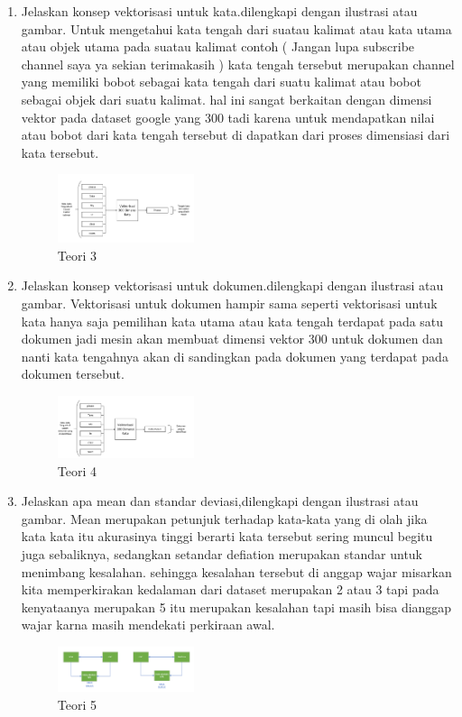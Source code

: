 \begin{enumerate}
	\item Jelaskan konsep vektorisasi untuk kata.dilengkapi dengan ilustrasi atau gambar.
	\hfill\break
	Untuk mengetahui kata tengah dari suatau kalimat atau kata utama atau objek utama pada suatau kalimat contoh ( Jangan lupa subscribe channel saya ya sekian terimakasih ) kata tengah tersebut merupakan channel yang memiliki bobot sebagai kata tengah dari suatu kalimat atau bobot sebagai objek dari suatu kalimat. hal ini sangat berkaitan dengan dimensi vektor pada dataset google yang 300 tadi karena untuk mendapatkan nilai atau bobot dari kata tengah tersebut di dapatkan dari proses dimensiasi dari kata tersebut. 
	\hfill\break
	\begin{figure}[H]
		\includegraphics[width=4cm]{figures/1174086/5/3.PNG}
		\centering
		\caption{Teori 3}
	\end{figure}

	\item Jelaskan konsep vektorisasi untuk dokumen.dilengkapi dengan ilustrasi atau gambar.
	\hfill\break
	Vektorisasi untuk dokumen hampir sama seperti vektorisasi untuk kata hanya saja pemilihan kata utama atau kata tengah terdapat pada satu dokumen jadi mesin akan membuat dimensi vektor 300 untuk dokumen dan nanti kata tengahnya akan di sandingkan pada dokumen yang terdapat pada dokumen tersebut.
	\hfill\break
	\begin{figure}[H]
		\includegraphics[width=4cm]{figures/1174086/5/4.PNG}
		\centering
		\caption{Teori 4}
	\end{figure}

	\item Jelaskan apa mean dan standar deviasi,dilengkapi dengan ilustrasi atau gambar.
	\hfill\break
	Mean merupakan petunjuk terhadap kata-kata yang di olah jika kata kata itu akurasinya tinggi berarti kata tersebut sering muncul begitu juga sebaliknya, sedangkan setandar defiation merupakan standar untuk menimbang kesalahan. sehingga kesalahan tersebut di anggap wajar misarkan kita memperkirakan kedalaman dari dataset merupakan 2 atau 3 tapi pada kenyataanya merupakan 5 itu merupakan kesalahan tapi masih bisa dianggap wajar karna masih mendekati perkiraan awal.
	\hfill\break
	\begin{figure}[H]
		\includegraphics[width=4cm]{figures/1174086/5/5.PNG}
		\centering
		\caption{Teori 5}
	\end{figure}


\end{enumerate}
